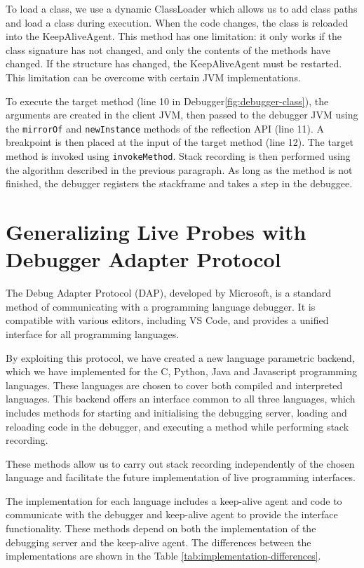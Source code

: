 \documentclass[english,submission]{programming}
\newcommand{\code}[1]{\colorbox{codegray}{\texttt{#1}}}
\begin{document}
To load a class, we use a dynamic ClassLoader which allows us to add class paths and load a class during execution. 
When the code changes, the class is reloaded into the KeepAliveAgent. 
This method has one limitation: it only works if the class signature has not changed, and only the contents of the methods have changed. 
If the structure has changed, the KeepAliveAgent must be restarted. 
This limitation can be overcome with certain JVM implementations\cite{KABANOV201151}.

To execute the target method (line 10 in Debugger\ref{fig:debugger-class}), the arguments are created in the client JVM, then passed to the debugger JVM using the \code{mirrorOf} and \code{newInstance} methods of the reflection API (line 11). 
A breakpoint is then placed at the input of the target method (line 12).
The target method is invoked using \code{invokeMethod}. 
Stack recording is then performed using the algorithm described in the previous paragraph. 
As long as the method is not finished, the debugger registers the stackframe and takes a step in the debuggee.

\section{Generalizing Live Probes with Debugger Adapter Protocol}
\label{sec:generalizing-live-probes}
The Debug Adapter Protocol (DAP), developed by Microsoft, is a standard method of communicating with a programming language debugger. It is compatible with various editors, including VS Code, and provides a unified interface for all programming languages. 

By exploiting this protocol, we have created a new language parametric backend, which we have implemented for the C, Python, Java and Javascript programming languages. These languages are chosen to cover both compiled and interpreted languages. 
This backend offers an interface common to all three languages, which includes methods for starting and initialising the debugging server, loading and reloading code in the debugger, and executing a method while performing stack recording. 

These methods allow us to carry out stack recording independently of the chosen language and facilitate the future implementation of live programming interfaces. 

The implementation for each language includes a keep-alive agent and code to communicate with the debugger and keep-alive agent to provide the interface functionality.
These methods depend on both the implementation of the debugging server and the keep-alive agent. The differences between the implementations are shown in the Table \ref{tab:implementation-differences}.
\end{document}

